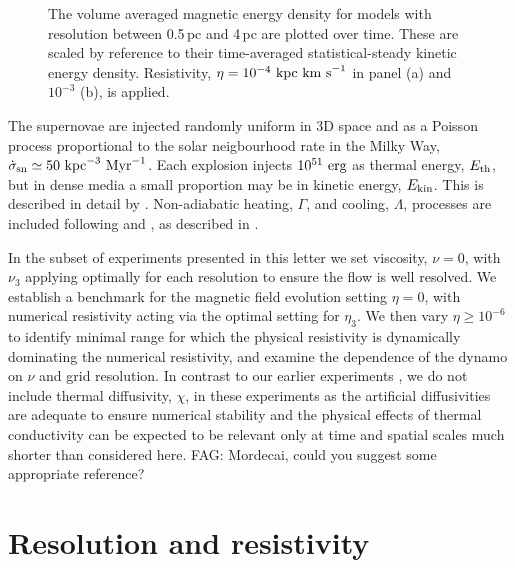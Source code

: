 \documentclass[preprint2]{aastex63}
\newcommand\SNr{\dot\sigma_{\rm sn}}
\newcommand\ESK{E_{\rm kin}}
\newcommand\EST{E_{\rm th}}
\newcommand\kpc{~ {\rm kpc}}
\newcommand\Myr{~ {\rm Myr}}
\newcommand\erg{~ {\rm erg}}
\newcommand\kms{~ {\rm km~ s}^{-1}}
\newcommand{\fag}[1]{\textcolor{midgreen}{FAG: #1}}
\begin{document}
\begin{figure*}
\caption{
The volume averaged magnetic energy density for models with resolution
between 0.5\,pc and 4\,pc are plotted over time.
These are scaled by reference to their
 time-averaged statistical-steady kinetic energy density.
Resistivity, $\eta=10^{-4}\kpc\kms$ in panel {\rm(a)} and $10^{-3}$
{\rm(b)}, is applied.
\label{fig:eb-res}}
\end{figure*}

The supernovae are injected randomly uniform in 3D space and as a
Poisson process proportional to the solar neigbourhood rate in the Milky Way,
 $\SNr\simeq 50\kpc^{-3}\Myr^{-1}$. 
Each explosion injects $10^{51}\erg$ as thermal energy, $\EST$, but in 
dense media a small proportion may be in kinetic energy, $\ESK$.
This is described in detail by \citet{GMKSH20}.
Non-adiabatic heating, $\Gamma$, and cooling, $\Lambda$, processes are included
following \citet{Wolfire:1995} and \citet{Sarazin:1987}, as described in 
\citet{Gent:2013a}. 

In the subset of experiments presented in this letter we set viscosity, $\nu=0$,
with $\nu_3$ applying optimally for each resolution to ensure the flow is 
well resolved.
We establish a benchmark for the magnetic field evolution setting $\eta=0$, with
numerical resistivity acting via the optimal setting for $\eta_3$.
We then vary $\eta\geq10^{-6}$ to identify minimal range for which the physical
resistivity is dynamically dominating the numerical resistivity, and examine the
dependence of the dynamo on $\nu$ and grid resolution. 
In contrast to our earlier experiments \citep{Gent:2013a,Gent:2013b,GMKSH20},
we do not include thermal diffusivity, $\chi$, in these experiments as 
the artificial diffusivities are adequate to ensure numerical stability and
the physical effects of thermal conductivity can be expected to be relevant only
at time and spatial scales much shorter than considered here.
\fag{Mordecai, could you suggest some appropriate reference?}

\section{Resolution and resistivity} \label{sec:results}
\end{document}
